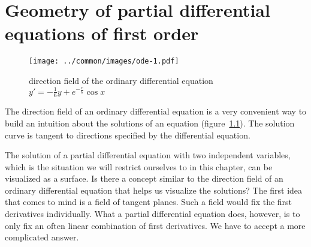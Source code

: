 %
%
%
\chapter{Geometry of partial differential equations of first order%
\label{chapter-geometrie}}
\begin{figure}
\begin{center}
\texttt{[image: ../common/images/ode-1.pdf]}
\end{center}
\caption{direction field of the ordinary differential equation 
$y'=-\frac16y+e^{-\frac{x}6}\cos x$ \label{geometrie:ode}}
\end{figure}
The direction field of an ordinary differential equation is a very
convenient way to build an intuition about the solutions of an equation
(figure~\ref{geometrie:ode}).
The solution curve is tangent to directions specified by the differential
equation.


The solution of a partial differential equation with two independent
variables, which is the situation we will restrict ourselves to in
this chapter, can be visualized as a surface.
Is there a concept similar to the direction field of an ordinary
differential equation that helps us visualize the solutions?
The first idea that comes to mind is a field of tangent planes.
Such a field would fix the first derivatives individually.
What a partial differential equation does, however, is to only fix an
often linear combination of first derivatives.
We have to accept a more complicated answer.






